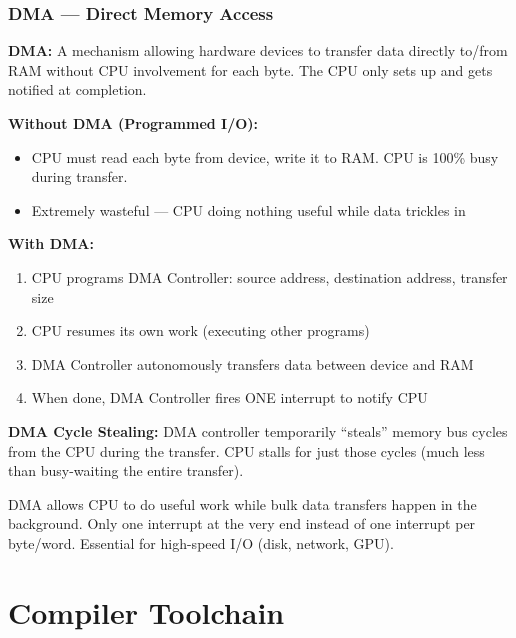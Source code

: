 \documentclass[11pt,a4paper]{article}
\newcommand{\term}[1]{\textbf{\color{darkblue}#1}}
\begin{document}
\subsubsection{DMA --- Direct Memory Access}

\begin{mydef}
\textbf{DMA:} A mechanism allowing hardware devices to transfer data directly to/from RAM without CPU involvement for each byte. The CPU only sets up and gets notified at completion.
\end{mydef}

\textbf{Without DMA (Programmed I/O):}
\begin{itemize}[noitemsep]
  \item CPU must read each byte from device, write it to RAM. CPU is 100\% busy during transfer.
  \item Extremely wasteful --- CPU doing nothing useful while data trickles in
\end{itemize}

\textbf{With DMA:}
\begin{enumerate}[noitemsep]
  \item CPU programs DMA Controller: source address, destination address, transfer size
  \item CPU resumes its own work (executing other programs)
  \item DMA Controller autonomously transfers data between device and RAM
  \item When done, DMA Controller fires ONE interrupt to notify CPU
\end{enumerate}

\term{DMA Cycle Stealing:} DMA controller temporarily ``steals'' memory bus cycles from the CPU during the transfer. CPU stalls for just those cycles (much less than busy-waiting the entire transfer).

\begin{keypoint}
DMA allows CPU to do useful work while bulk data transfers happen in the background. Only one interrupt at the very end instead of one interrupt per byte/word. Essential for high-speed I/O (disk, network, GPU).
\end{keypoint}

\section{Compiler Toolchain}
\end{document}
